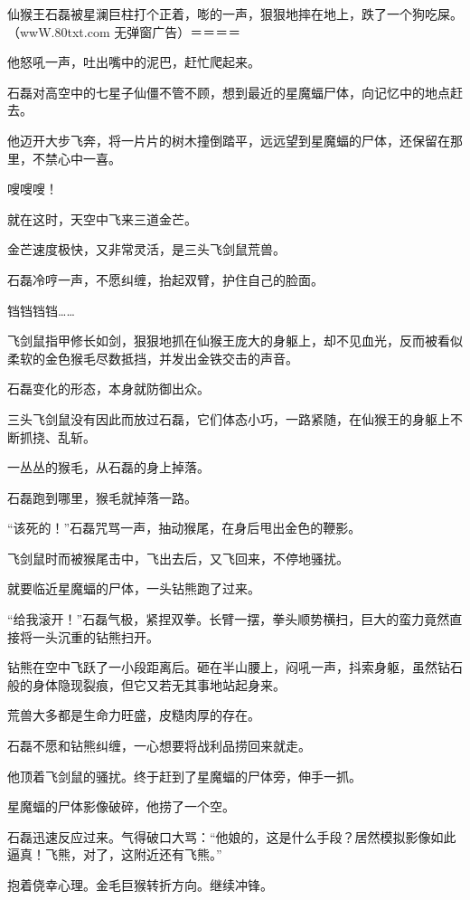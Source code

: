 
\begin{this_body}

仙猴王石磊被星澜巨柱打个正着，嘭的一声，狠狠地摔在地上，跌了一个狗吃屎。（wwW.80txt.com 无弹窗广告）＝＝＝＝

他怒吼一声，吐出嘴中的泥巴，赶忙爬起来。

石磊对高空中的七星子仙僵不管不顾，想到最近的星魔蝠尸体，向记忆中的地点赶去。

他迈开大步飞奔，将一片片的树木撞倒踏平，远远望到星魔蝠的尸体，还保留在那里，不禁心中一喜。

嗖嗖嗖！

就在这时，天空中飞来三道金芒。

金芒速度极快，又非常灵活，是三头飞剑鼠荒兽。

石磊冷哼一声，不愿纠缠，抬起双臂，护住自己的脸面。

铛铛铛铛……

飞剑鼠指甲修长如剑，狠狠地抓在仙猴王庞大的身躯上，却不见血光，反而被看似柔软的金色猴毛尽数抵挡，并发出金铁交击的声音。

石磊变化的形态，本身就防御出众。

三头飞剑鼠没有因此而放过石磊，它们体态小巧，一路紧随，在仙猴王的身躯上不断抓挠、乱斩。

一丛丛的猴毛，从石磊的身上掉落。

石磊跑到哪里，猴毛就掉落一路。

“该死的！”石磊咒骂一声，抽动猴尾，在身后甩出金色的鞭影。

飞剑鼠时而被猴尾击中，飞出去后，又飞回来，不停地骚扰。

就要临近星魔蝠的尸体，一头钻熊跑了过来。

“给我滚开！”石磊气极，紧捏双拳。长臂一摆，拳头顺势横扫，巨大的蛮力竟然直接将一头沉重的钻熊扫开。

钻熊在空中飞跃了一小段距离后。砸在半山腰上，闷吼一声，抖索身躯，虽然钻石般的身体隐现裂痕，但它又若无其事地站起身来。

荒兽大多都是生命力旺盛，皮糙肉厚的存在。

石磊不愿和钻熊纠缠，一心想要将战利品捞回来就走。

他顶着飞剑鼠的骚扰。终于赶到了星魔蝠的尸体旁，伸手一抓。

星魔蝠的尸体影像破碎，他捞了一个空。

石磊迅速反应过来。气得破口大骂：“他娘的，这是什么手段？居然模拟影像如此逼真！飞熊，对了，这附近还有飞熊。”

抱着侥幸心理。金毛巨猴转折方向。继续冲锋。


\end{this_body}
